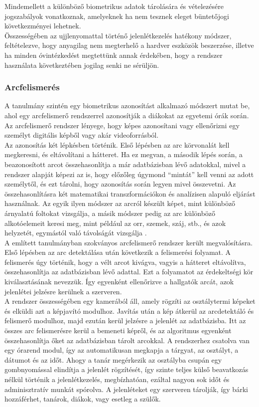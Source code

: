 \documentclass[12pt]{article}
\numberwithin{figure}{section}
\numberwithin{equation}{section}
\begin{document}
Mindemellett a különböző biometrikus adatok tárolására és vételezésére jogszabályok vonatkoznak, amelyeknek ha nem tesznek eleget büntetőjogi következményei lehetnek.\\
Összességében az ujjlenyomattal történő jelenlétkezelés hatékony módszer, feltételezve, hogy anyagilag nem megterhelő a hardver eszközök beszerzése, illetve ha minden óvintézkedést megtettünk annak érdekében, hogy a rendszer használata következtében jogilag senki ne sérüljön.\\

\subsubsection{Arcfelismerés}
A \cite{7} tanulmány szintén egy biometrikus azonosítást alkalmazó módszert mutat be, ahol egy arcfelismerő rendszerrel azonosítják a diákokat az egyetemi órák során. \\
Az arcfelismerő rendszer lényege, hogy képes azonosítani vagy ellenőrizni egy személyt digitális képből vagy akár videoforrásból.\\
Az azonosítás két lépkésben történik. Első lépésben az arc körvonalát kell megkeresni, és eltávolítani a hátteret. Ha ez megvan, a második lépés során, a beazonosított arcot összehasonlítja a már adatbázisban lévő adatokkal, mivel a rendszer alapját képezi az is, hogy előzőleg úgymond \enquote{mintát} kell venni az adott személytől, és ezt tárolni, hogy azonosítás során legyen mivel összevetni. Az összehasonlításra két matematikai transzformációkon és analízisen alapuló eljárást használnak. Az egyik ilyen módszer az arcról készült képet, mint különböző árnyalatú foltokat vizsgálja, a másik módszer pedig az arc különböző alkotóelemeit keresi meg, mint például az orr, szemek, száj, stb., és azok helyzetét, egymástól való távolságát vizsgálja \cite{6}.  \\
A említett tanulmányban szokványos arcfelismerő rendszer került megvalósításra. Első lépésben az arc detektálása után következik a felismerési folyamat. A felismerés úgy történik, hogy a vélt arcot kivágva, vagyis a hátteret eltávolítva, összehasonlítja az adatbázisban lévő adattal. Ezt a folyamatot az érdekeltségi kör kiválasztásának nevezzük. Így egyenként ellenőrizve a hallgatók arcát, azok jelenlétei jelzésre kerülnek a szerveren. \\
A rendszer összességében egy kamerából áll, amely rögzíti az osztálytermi képeket és elküldi azt a képjavító modulhoz. Javítás után a kép átkerül az arcdetektáló és felismerő modulhoz, majd ezután kerül jelzésre a jelenlét az adatbázisba. Itt az összes arc felismerésre kerül a bemeneti képről, és az algoritmus egyenként összehasonlítja őket az adatbázisban tárolt arcokkal. A rendszerhez csatolva van egy órarend modul, így az automatikusan megkapja a tárgyat, az osztályt, a dátumot és az időt. Ahogy a tanár megérkezik az osztályba csupán egy gombnyomással elindítja a jelenlét rögzítését, így szinte teljes külső beavatkozás nélkül történik a jelenlétkezelés, megbízhatóan, ezáltal nagyon sok időt és adminisztratív munkát spórolva. A jelenléteket egy szerveren tárolják, így bárki hozzáférhet, tanárok, diákok, vagy esetleg a szülők.\\
\end{document}
